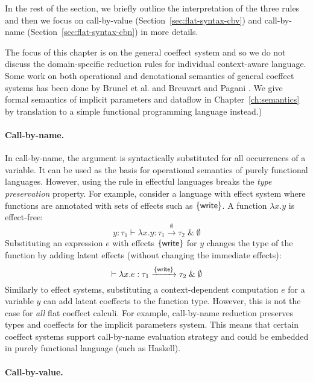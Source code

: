 In the rest of the section, we briefly outline the interpretation of the three
rules and then we focus on call-by-value (Section~\ref{sec:flat-syntax-cbv}) and call-by-name
(Section~\ref{sec:flat-syntax-cbn}) in more details.

The focus of this chapter is on the general coeffect system and so we do not discuss the
domain-specific reduction rules for individual context-aware language. Some work on both operational
and denotational semantics of general coeffect systems has been done by Brunel et al.
\cite{coeffects-quantitative} and Breuvart and Pagani \cite{coeffects-modelling}.
We give formal semantics of implicit parameters and dataflow in Chapter~\ref{ch:semantics} by
translation to a simple functional programming language instead.)

\paragraph{Call-by-name.}
In call-by-name, the argument is syntactically substituted for all occurrences of a variable. It
can be used as the basis for operational semantics of purely functional languages. However, using
the rule in effectful languages breaks the \emph{type preservation} property. For example, consider
a language with effect system where functions are annotated with sets of effects such as $\{ \textnormal{\sffamily write} \}$.
A function $\lambda x.y$ is effect-free:
%
\begin{equation*}
y\!:\!\tau_1 \vdash \lambda x.y : \tau_1 \xrightarrow{\emptyset} \tau_2 \;\&\; \emptyset
\end{equation*}
%
Substituting an expression $e$ with effects $\{ \textnormal{\sffamily write} \}$ for $y$ changes the type of
the function by adding latent effects (without changing the immediate effects):
%
\begin{equation*}
\vdash \lambda x.e : \tau_1 \xrightarrow{ \{ \textnormal{\sffamily write} \} } \tau_2 \;\&\; \emptyset
\end{equation*}
%
Similarly to effect systems, substituting a context-dependent computation $e$ for a variable $y$ can
add latent coeffects to the function type. However, this is not the case for \emph{all} flat coeffect
calculi. For example, call-by-name reduction preserves types and coeffects for the implicit
parameters system. This means that certain coeffect systems support call-by-name evaluation strategy
and could be embedded in purely functional language (such as Haskell).

\paragraph{Call-by-value.}

